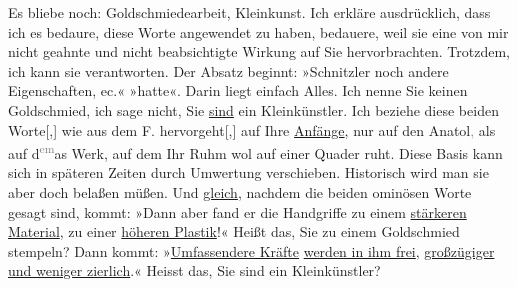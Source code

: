 \pstart
           Es bliebe noch: Goldschmiedearbeit, Kleinkunst. Ich erkläre ausdrücklich, dass ich es
               bedaure, diese Worte angewendet zu haben, bedauere, weil sie eine von mir nicht
               geahnte und nicht beabsichtigte Wirkung auf Sie hervorbrachten. Trotzdem, ich kann
               sie verantworten. Der Absatz beginnt: »Schnitzler  noch andere
                  Eigenschaften, ec.« »hatte«. Darin liegt einfach Alles. Ich nenne Sie keinen Goldschmied, ich
               sage nicht, Sie \uline{sind} ein Kleinkünstler. Ich beziehe
               diese beiden Worte{[},{]} wie aus dem F. hervorgeht{[},{]}{ } auf Ihre \uline{Anfänge},
               nur auf den Anatol\textcolor{gray}{,} als auf d\substVorne{}\textsuperscript{\textcolor{gray}{em}}\substDazwischen{}as\substHinten{} Werk, auf dem Ihr Ruhm wol auf einer Quader ruht. Diese Basis kann sich in späteren
               Zeiten durch Umwertung verschieben. Historisch wird man sie aber doch belaßen müßen.
               Und \uline{gleich}, nachdem die beiden ominösen Worte gesagt
               sind, kommt: »Dann aber fand er die
                  Handgriffe zu einem \uline{stärkeren Material}, zu einer
                     \uline{höheren Plastik}!« Heißt das, Sie zu einem
               Goldschmied stempeln? Dann kommt: »\uline{Umfassendere Kräfte}{ }\uline{werden in ihm frei}, \uline{großzügiger und weniger zierlich}.« Heisst das, Sie sind ein
               Kleinkünstler?\pend
           
